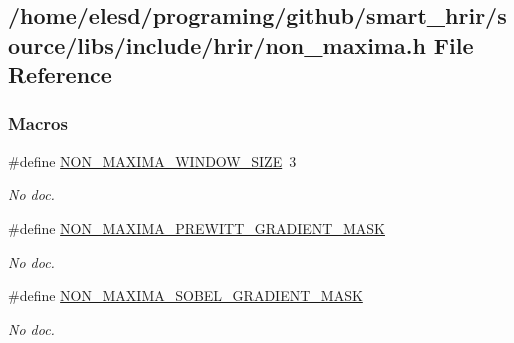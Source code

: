 \hypertarget{a00015}{\subsection{/home/elesd/programing/github/smart\-\_\-hrir/source/libs/include/hrir/non\-\_\-maxima.h File Reference}
\label{a00015}
}
\subsubsection*{Macros}
\begin{DoxyCompactItemize}
\item 
\hypertarget{a00015_a954ca9bc6ed395484b8f107ab58cd4fc}{\#define \hyperlink{a00015_a954ca9bc6ed395484b8f107ab58cd4fc}{N\-O\-N\-\_\-\-M\-A\-X\-I\-M\-A\-\_\-\-W\-I\-N\-D\-O\-W\-\_\-\-S\-I\-Z\-E}~3}\label{a00015_a954ca9bc6ed395484b8f107ab58cd4fc}

\begin{DoxyCompactList}\small\item\em No doc. \end{DoxyCompactList}\item 
\#define \hyperlink{a00015_afb7e961811a547dd26ea3253951d16a1}{N\-O\-N\-\_\-\-M\-A\-X\-I\-M\-A\-\_\-\-P\-R\-E\-W\-I\-T\-T\-\_\-\-G\-R\-A\-D\-I\-E\-N\-T\-\_\-\-M\-A\-S\-K}
\begin{DoxyCompactList}\small\item\em No doc. \end{DoxyCompactList}\item 
\#define \hyperlink{a00015_a9bd4bb9ae8e0c43311ca780ab05cfcea}{N\-O\-N\-\_\-\-M\-A\-X\-I\-M\-A\-\_\-\-S\-O\-B\-E\-L\-\_\-\-G\-R\-A\-D\-I\-E\-N\-T\-\_\-\-M\-A\-S\-K}
\begin{DoxyCompactList}\small\item\em No doc. \end{DoxyCompactList}\end{DoxyCompactItemize}
